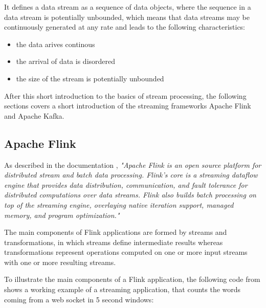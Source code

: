 It defines a data stream as a sequence of data objects, where the sequence in a data stream
is potentially unbounded, which means that data streams may be continuously generated
at any rate \cite{Nam15} and leads to the following characteristics:
\begin{itemize}
	\item the data arives continous
	\item the arrival of data is disordered
	\item the size of the stream is potentially unbounded
\end{itemize}

After this short introduction to the basics of stream processing, the following sections
covers a short introduction of the streaming frameworks Apache Flink and Apache Kafka.
\subsection{Apache Flink}

As described in the documentation \cite{Flink16}, \textit{"Apache Flink is an open source platform for
distributed stream and batch data processing. Flink’s core is a streaming dataflow engine that
provides data distribution, communication, and fault tolerance for distributed computations over
data streams. Flink also builds batch processing on top of the streaming engine, overlaying native
iteration support, managed memory, and program optimization."}

The main components of Flink applications are formed by streams and transformations, in which
streams define intermediate results whereas transformations represent operations computed on one
or more input streams with one or more resulting streams.

To illustrate the main components of a Flink application, the following code from \cite{Flink16} shows
a working example of a streaming application, that counts the words coming from a web socket in 5
second windows:

